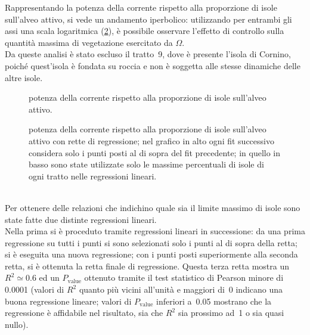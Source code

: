 Rappresentando la potenza della corrente rispetto alla proporzione di isole sull'alveo attivo, si vede un andamento iperbolico: utilizzando per entrambi gli assi una scala logaritmica (\cref{graph:omega-area-percentuale}), è possibile osservare l'effetto di controllo sulla quantità massima di vegetazione esercitato da $\Omega$.
\\
Da queste analisi è stato escluso il tratto~9, dove è presente l'isola di Cornino, poiché quest'isola è fondata su roccia e non è soggetta alle stesse dinamiche delle altre isole.
%
\begin{figure}
	\centering
	
	\caption[potenza della corrente rispetto alla proporzione di isole sull'alveo attivo, grafico lineare]{potenza della corrente rispetto alla proporzione di isole sull'alveo attivo.}
	\label{graph:omega-area-percentuale-linear}
\end{figure}
%
\begin{figure}
	\centering
	
	\caption[potenza della corrente rispetto alla proporzione di isole sull'alveo attivo, grafici bilogaritmico]{potenza della corrente rispetto alla proporzione di isole sull'alveo attivo con rette di regressione; nel grafico in alto ogni fit successivo considera solo i punti posti al di sopra del fit precedente; in quello in basso sono state utilizzate solo le massime percentuali di isole di ogni tratto nelle regressioni lineari.}
	\label{graph:omega-area-percentuale}
\end{figure}
%
%	
%
\\
Per ottenere delle relazioni che indichino quale sia il limite massimo di isole sono state fatte due distinte regressioni lineari.
\\
Nella prima si è proceduto tramite regressioni lineari in successione: da una prima regressione su tutti i punti si sono selezionati solo i punti al di sopra della retta; si è eseguita una nuova regressione; con i punti posti superiormente alla seconda retta, si è ottenuta la retta finale di regressione.
Questa terza retta mostra un $R^2 \simeq 0.6$ ed un $P_\mathrm{value}$ ottenuto tramite il test statistico di Pearson minore di \num{0.0001} (valori di $R^2$ quanto più vicini all'unità e maggiori di~\num{0} indicano una buona regressione lineare; valori di $P_\mathrm{value}$ inferiori a~\num{0.05} mostrano che la regressione è affidabile nel risultato, sia che $R^2$ sia prossimo ad~\num{1} o sia quasi nullo).
